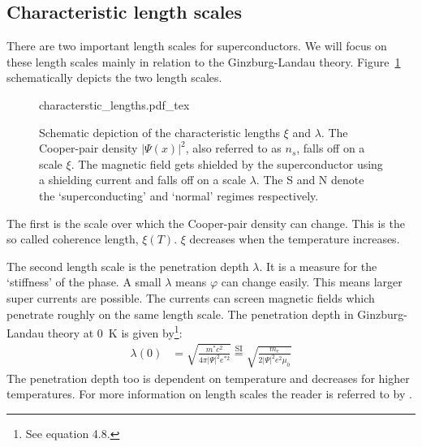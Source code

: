 \subsection{Characteristic length scales}
\label{sec:characteristic-length-scales}
There are two important length scales for superconductors. We will focus on these length scales mainly in relation to the Ginzburg-Landau theory.  Figure~\ref{fig:characteristic-lengths} schematically depicts the two length scales.

\begin{figure}[ht!]
	\centering
	\def\svgwidth{\textwidth}
	{characterstic_lengths.pdf_tex}
	\caption{Schematic depiction of the characteristic lengths $\xi$ and $\lambda$. The Cooper-pair density $|\Psi(x)|^2$, also referred to as $n_s$, falls off on a scale $\xi$. The magnetic field gets shielded by the superconductor using a shielding current and falls off on a scale $\lambda$. The S and N denote the `superconducting' and `normal' regimes respectively.}
	\label{fig:characteristic-lengths}
\end{figure}

The first is the scale over which the Cooper-pair density can change. This is the so called coherence length, $\xi(T)$. $\xi$ decreases when the temperature increases.\cite{tinkhamIntroductionSuperconductivity}

The second length scale is the penetration depth $\lambda$. It is a measure for the `stiffness' of the phase. A small $\lambda$ means $\varphi$ can change easily. This means larger super currents are possible. The currents can screen magnetic fields which penetrate roughly on the same length scale. The penetration depth in Ginzburg-Landau theory at \qty{0}{\kelvin} is given by\footnote{See  equation 4.8.}:
\begin{align}
	\lambda(0) &= \sqrt{\frac{m^*c^2}{4\pi|\Psi|^2e^{*2}}} \stackrel{\text{SI}}{=} \sqrt{\frac{m_e}{2|\Psi|^2e^2\mu_0}}
	\label{eqn:london-penetration-depth}
\end{align}
The penetration depth too is dependent on temperature and decreases for higher temperatures. For more information on length scales the reader is referred to  by \citeauthor{tinkhamIntroductionSuperconductivity}.


